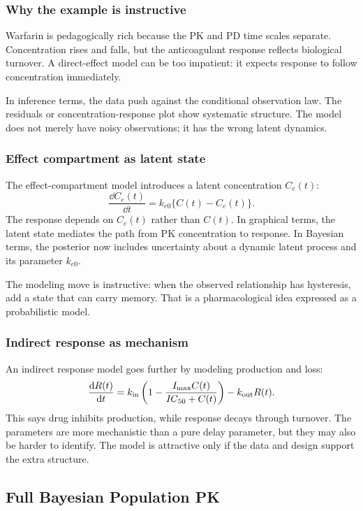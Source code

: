 \subsubsection*{Why the example is instructive}

Warfarin is pedagogically rich because the PK and PD time scales separate.  Concentration rises and falls, but the anticoagulant response reflects biological turnover.  A direct-effect model can be too impatient: it expects response to follow concentration immediately.

In inference terms, the data push against the conditional observation law.  The residuals or concentration-response plot show systematic structure.  The model does not merely have noisy observations; it has the wrong latent dynamics.

\subsubsection*{Effect compartment as latent state}

The effect-compartment model introduces a latent concentration \(C_e(t)\):
\[
  \frac{\dd C_e(t)}{\dd t}=k_{e0}\{C(t)-C_e(t)\}.
\]
The response depends on \(C_e(t)\) rather than \(C(t)\).  In graphical terms, the latent state mediates the path from PK concentration to response.  In Bayesian terms, the posterior now includes uncertainty about a dynamic latent process and its parameter \(k_{e0}\).

The modeling move is instructive: when the observed relationship has hysteresis, add a state that can carry memory.  That is a pharmacological idea expressed as a probabilistic model.

\subsubsection*{Indirect response as mechanism}

An indirect response model goes further by modeling production and loss:
\[
  \frac{\dd R(t)}{\dd t}
  =
  k_{\mathrm{in}}\left(1-\frac{I_{\max}C(t)}{\pksym{IC}_{50}+C(t)}\right)
  -
  k_{\mathrm{out}}R(t).
\]
This says drug inhibits production, while response decays through turnover.  The parameters are more mechanistic than a pure delay parameter, but they may also be harder to identify.  The model is attractive only if the data and design support the extra structure.

\subsection{Full Bayesian Population PK}

